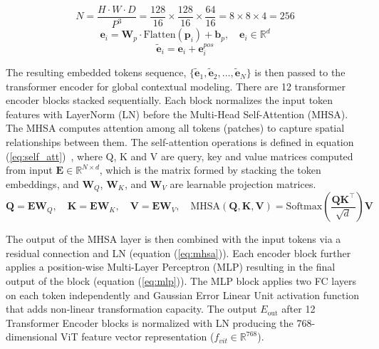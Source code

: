 \documentclass[12pt]{article}
\begin{document}
\begin{equation} \label{eq:patch_count} 
N = \frac{H \cdot W \cdot D}{P^3} = \frac{128}{16} \times \frac{128}{16} \times \frac{64}{16} = 8 \times 8 \times 4 = 256 
\end{equation}
\begin{equation} \label{eq:patch_emb} 
\mathbf{e}_i = \mathbf{W}_p \cdot \text{Flatten}(\mathbf{p}_i) + \mathbf{b}_p,
\quad \mathbf{e}_i \in \mathbb{R}^{d}
\end{equation}
\begin{equation} \label{eq:pos_emb}
\tilde{\mathbf{e}}_i = \mathbf{e}_i + \mathbf{e}_i^{pos}
\end{equation}

The resulting embedded tokens sequence, $\{\tilde{\mathbf{e}}_1, \tilde{\mathbf{e}}_2, \ldots, \tilde{\mathbf{e}}_N\}$ is then passed to the transformer encoder for global contextual modeling. There are 12 transformer encoder blocks stacked sequentially. Each block normalizes the input token features with LayerNorm (LN) before the Multi-Head Self-Attention (MHSA). The MHSA computes attention among all tokens (patches) to capture spatial relationships between them. The self-attention operations is defined in equation (\ref{eq:self_att})~\cite{Aloraini_2023}, where Q, K and V are query, key and value matrices computed from input $\mathbf{E} \in \mathbb{R}^{N \times d}$, which is the matrix formed by stacking the token embeddings, and $\mathbf{W}_Q$, $\mathbf{W}_K$, and $\mathbf{W}_V$ are learnable projection matrices.
\begin{equation} \label{eq:self_att}
\mathbf{Q} = \mathbf{E}\mathbf{W}_Q, \quad
\mathbf{K} = \mathbf{E}\mathbf{W}_K, \quad
\mathbf{V} = \mathbf{E}\mathbf{W}_V, \quad
\text{MHSA}(\mathbf{Q}, \mathbf{K}, \mathbf{V})
=
\text{Softmax}\!\left(
\frac{\mathbf{Q}\mathbf{K}^\top}{\sqrt{d}}
\right)\mathbf{V}
\end{equation}

The output of the MHSA layer is then combined with the input tokens via a residual connection and LN (equation (\ref{eq:mhsa})). Each encoder block further applies a position-wise Multi-Layer Perceptron (MLP) resulting in the final output of the block (equation (\ref{eq:mlp})). The MLP block applies two FC layers on each token independently and Gaussian Error Linear Unit activation function that adds non-linear transformation capacity. The output ${E}_{\text{out}}$ after 12 Transformer Encoder blocks is normalized with LN producing the 768-dimensional ViT feature vector representation ($f_{vit} \in \mathbb{R}^{768}$).
\end{document}
